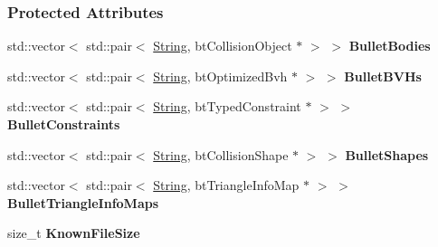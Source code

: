 \subsubsection*{Protected Attributes}
\begin{DoxyCompactItemize}
\item 
\hypertarget{classMezzanine_1_1internal_1_1BulletFile_ae1adef25a761f0095a7d084b62af3b06}{
std::vector$<$ std::pair$<$ \hyperlink{namespaceMezzanine_acf9fcc130e6ebf08e3d8491aebcf1c86}{String}, btCollisionObject $\ast$ $>$ $>$ {\bfseries BulletBodies}}
\label{classMezzanine_1_1internal_1_1BulletFile_ae1adef25a761f0095a7d084b62af3b06}

\item 
\hypertarget{classMezzanine_1_1internal_1_1BulletFile_a20a8642d594264bcb9bc6a2b3922050d}{
std::vector$<$ std::pair$<$ \hyperlink{namespaceMezzanine_acf9fcc130e6ebf08e3d8491aebcf1c86}{String}, btOptimizedBvh $\ast$ $>$ $>$ {\bfseries BulletBVHs}}
\label{classMezzanine_1_1internal_1_1BulletFile_a20a8642d594264bcb9bc6a2b3922050d}

\item 
\hypertarget{classMezzanine_1_1internal_1_1BulletFile_af26354729e26b5084b9dd684fa47f407}{
std::vector$<$ std::pair$<$ \hyperlink{namespaceMezzanine_acf9fcc130e6ebf08e3d8491aebcf1c86}{String}, btTypedConstraint $\ast$ $>$ $>$ {\bfseries BulletConstraints}}
\label{classMezzanine_1_1internal_1_1BulletFile_af26354729e26b5084b9dd684fa47f407}

\item 
\hypertarget{classMezzanine_1_1internal_1_1BulletFile_a9a80fe5006d24cd8a5b97b3624d6d82f}{
std::vector$<$ std::pair$<$ \hyperlink{namespaceMezzanine_acf9fcc130e6ebf08e3d8491aebcf1c86}{String}, btCollisionShape $\ast$ $>$ $>$ {\bfseries BulletShapes}}
\label{classMezzanine_1_1internal_1_1BulletFile_a9a80fe5006d24cd8a5b97b3624d6d82f}

\item 
\hypertarget{classMezzanine_1_1internal_1_1BulletFile_a6c96e26328b771a398248300563a91e2}{
std::vector$<$ std::pair$<$ \hyperlink{namespaceMezzanine_acf9fcc130e6ebf08e3d8491aebcf1c86}{String}, btTriangleInfoMap $\ast$ $>$ $>$ {\bfseries BulletTriangleInfoMaps}}
\label{classMezzanine_1_1internal_1_1BulletFile_a6c96e26328b771a398248300563a91e2}

\item 
\hypertarget{classMezzanine_1_1internal_1_1BulletFile_a5ccd75fe33de6bb066d63be23fd46927}{
size\_\-t {\bfseries KnownFileSize}}
\label{classMezzanine_1_1internal_1_1BulletFile_a5ccd75fe33de6bb066d63be23fd46927}

\end{DoxyCompactItemize}


